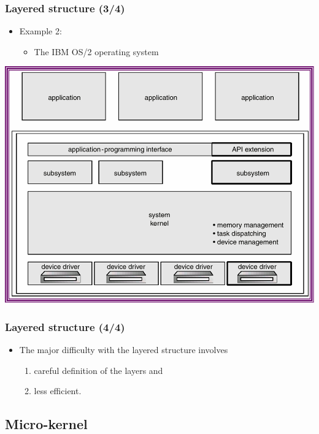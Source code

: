 \documentclass[CJKutf8,xcolor=pdftex,dvipsnames,table]{beamer}
\begin{document}
\begin{CJK*}{UTF8}{song}
  \begin{frame}
    \frametitle{Layered structure (3/4)} \pause
    \begin{itemize}
    \item{Example 2:} \pause
      \begin{itemize}
      \item{The IBM OS/2 operating system} \pause
      \end{itemize}
    \end{itemize}
    \begin{center}
      \includegraphics[scale=0.5]{v6f3-9}
    \end{center}
  \end{frame}
  
  \begin{frame}
    \frametitle{Layered structure (4/4)} \pause
    \begin{itemize}
    \item{The major difficulty with the layered structure involves} \pause
      \begin{enumerate}
      \item{careful definition of the layers and} \pause
      \item{less efficient.}
      \end{enumerate}
    \end{itemize}
  \end{frame}
  
  \subsection{Micro-kernel}


\end{CJK*}
\end{document}
